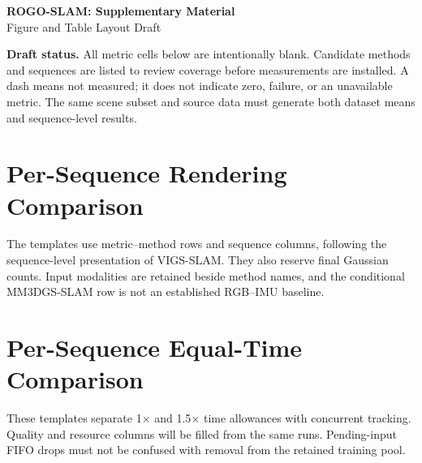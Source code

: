 \clearpage
\renewcommand{\thepage}{S\arabic{page}}
\setcounter{page}{1}
\onecolumn
\appendix
\begin{center}
  \Large\textbf{ROGO-SLAM: Supplementary Material}\\[0.3cm]
  \large Figure and Table Layout Draft
\end{center}

\noindent\textbf{Draft status.}
All metric cells below are intentionally blank. Candidate methods and sequences
are listed to review coverage before measurements are installed. A dash means
not measured; it does not indicate zero, failure, or an unavailable metric.
The same scene subset and source data must generate both dataset means and
sequence-level results.

\section{Per-Sequence Rendering Comparison}
\label{app:rendering}
The templates use metric--method rows and sequence columns, following the
sequence-level presentation of VIGS-SLAM. They also reserve final Gaussian
counts. Input modalities are retained beside method names, and the conditional
MM3DGS-SLAM row is not an established RGB--IMU baseline.


\clearpage

\section{Per-Sequence Equal-Time Comparison}
\label{app:time}
These templates separate 1$\times$ and 1.5$\times$ time allowances with concurrent
tracking. Quality and resource columns will be filled from the same runs.
Pending-input FIFO drops must not be confused with removal from the retained
training pool.


\clearpage
